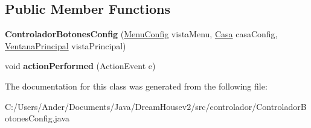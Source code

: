 \subsection*{Public Member Functions}
\begin{DoxyCompactItemize}
\item 
\mbox{\label{classcontrolador_1_1_controlador_botones_config_a4af8c80c8585506639754cfb7f77eb61}} 
{\bfseries Controlador\+Botones\+Config} (\mbox{\hyperlink{classvista_1_1_menu_config}{Menu\+Config}} vista\+Menu, \mbox{\hyperlink{classmodelo_1_1_casa}{Casa}} casa\+Config, \mbox{\hyperlink{classvista_1_1_ventana_principal}{Ventana\+Principal}} vista\+Principal)
\item 
\mbox{\label{classcontrolador_1_1_controlador_botones_config_a2cd5a386f11405de4564bc37e1f21850}} 
void {\bfseries action\+Performed} (Action\+Event e)
\end{DoxyCompactItemize}


The documentation for this class was generated from the following file\+:\begin{DoxyCompactItemize}
\item 
C\+:/\+Users/\+Ander/\+Documents/\+Java/\+Dream\+Housev2/src/controlador/Controlador\+Botones\+Config.\+java\end{DoxyCompactItemize}
